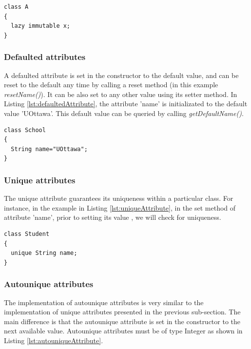 \begin{lstlisting}[style=umplePlain,label=lst:lazyimmutableAttribute, caption=Lazy immutable Umple attribute]
class A 
{
  lazy immutable x;
}
\end{lstlisting}


\subsubsection{Defaulted attributes}
A defaulted attribute is set in the constructor to the default value, and can be reset to the default any time by calling a reset method (in this example \textit{resetName()}). It can be also set to any other value using its setter method. In Listing \ref{lst:defaultedAttribute}, the attribute 'name' is initializated to the default value 'UOttawa'. This default value can be queried by calling \textit{getDefaultName()}.

\begin{lstlisting}[style=umplePlain,label=lst:defaultedAttribute, caption=Defaulted Umple attribute]
class School 
{
  String name="UOttawa";
}
\end{lstlisting}


\subsubsection{Unique attributes}
The unique attribute guarantees its uniqueness within a particular class.
For instance, in the example in Listing \ref{lst:uniqueAttribute}, in the set method of attribute 'name', prior to setting its value , we will check for uniqueness. 

\begin{lstlisting}[style=umplePlain,label=lst:uniqueAttribute, caption=Unique Umple attribute]
class Student 
{
  unique String name;
}
\end{lstlisting}

\subsubsection{Autounique attributes}
The implementation of autounique attributes is very similar to the implementation of unique attributes presented in the previous sub-section. The main difference is that the autounique attribute is set in the constructor to the next available value. Autounique attributes must be of type Integer as shown in Listing \ref{lst:autouniqueAttribute}.

